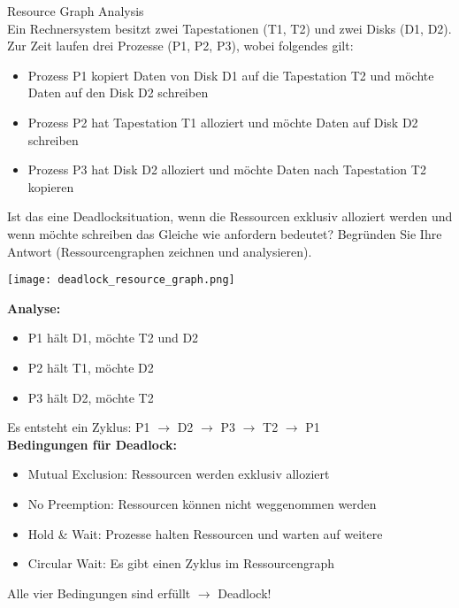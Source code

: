 \begin{example2}{Resource Graph Analysis}\\
    Ein Rechnersystem besitzt zwei Tapestationen (T1, T2) und zwei Disks (D1, D2). Zur Zeit laufen drei Prozesse (P1, P2, P3), wobei folgendes gilt:
    \begin{itemize}
        \item Prozess P1 kopiert Daten von Disk D1 auf die Tapestation T2 und möchte Daten auf den Disk D2 schreiben
        \item Prozess P2 hat Tapestation T1 alloziert und möchte Daten auf Disk D2 schreiben
        \item Prozess P3 hat Disk D2 alloziert und möchte Daten nach Tapestation T2 kopieren
    \end{itemize}
    
    Ist das eine Deadlocksituation, wenn die Ressourcen exklusiv alloziert werden und wenn möchte schreiben das Gleiche wie anfordern bedeutet? Begründen Sie Ihre Antwort (Ressourcengraphen zeichnen und analysieren).
    
    \tcblower

    \begin{minipage}{0.4\linewidth}
        \texttt{[image: deadlock\_resource\_graph.png]}
    \end{minipage}
    \begin{minipage}{0.58\linewidth}    
    \textbf{Analyse:}
    \begin{itemize}
        \item P1 hält D1, möchte T2 und D2
        \item P2 hält T1, möchte D2  
        \item P3 hält D2, möchte T2
    \end{itemize}
    
    Es entsteht ein Zyklus: P1 $\rightarrow$ D2 $\rightarrow$ P3 $\rightarrow$ T2 $\rightarrow$ P1\\
    
    \textbf{Bedingungen für Deadlock:}
    \begin{itemize}
        \item Mutual Exclusion: Ressourcen werden exklusiv alloziert
        \item No Preemption: Ressourcen können nicht weggenommen werden
        \item Hold \& Wait: Prozesse halten Ressourcen und warten auf weitere
        \item Circular Wait: Es gibt einen Zyklus im Ressourcengraph
    \end{itemize}
    
    Alle vier Bedingungen sind erfüllt $\rightarrow$ Deadlock!
    \end{minipage}
\end{example2}

